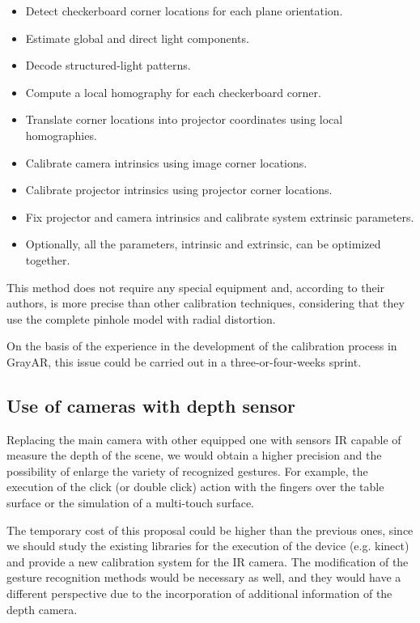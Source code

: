 \begin{itemize}
\item Detect checkerboard corner locations for each plane orientation.
\item Estimate global and direct light components.
\item Decode structured-light patterns.
\item Compute a local homography for each checkerboard corner.
\item Translate corner locations into projector coordinates using local homographies.
\item Calibrate camera intrinsics using image corner locations.
\item Calibrate projector intrinsics using projector corner locations.
\item Fix projector and camera intrinsics and calibrate system extrinsic parameters.
\item Optionally, all the parameters, intrinsic and extrinsic, can be optimized together.
\end{itemize}

This method does not require any special equipment and, according to their authors, is more precise than other calibration techniques, considering that they use the complete pinhole model with radial distortion.
 
On the basis of the experience in the development of the calibration process in GrayAR, this issue could be carried out in a three-or-four-weeks sprint.

\subsection{Use of cameras with depth sensor}
Replacing the main camera with other equipped one with sensors IR capable of measure the depth of the scene, we would obtain a higher precision and the possibility of enlarge the variety of recognized gestures. For example, the execution of the click (or double click) action with the fingers over the table surface or the simulation of a multi-touch surface.

The temporary cost of this proposal could be higher than the previous ones, since we should study the existing libraries for the execution of the device (e.g. kinect) and provide a new calibration system for the IR camera. The modification of the gesture recognition methods would be necessary as well, and they would have a different perspective due to the incorporation of additional information of the depth camera.

